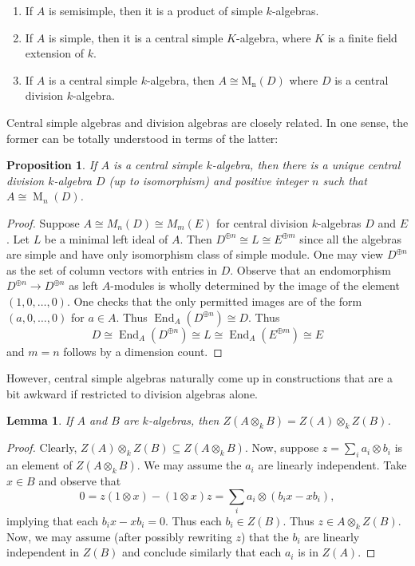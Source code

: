 \documentclass[12pt]{article}
\theoremstyle{plain}
\newtheorem{lemma}[theorem]{Lemma}
\newtheorem{proposition}[theorem]{Proposition}
\theoremstyle{definition}
\theoremstyle{remark}
\numberwithin{equation}{section}
\begin{document}
\begin{enumerate}
\item If $A$ is semisimple, then it is a product of simple $k$-algebras.
\item If $A$ is simple, then it is a central simple $K$-algebra, where
$K$ is a finite field extension of $k$.
\item If $A$ is a central simple $k$-algebra, then $A \cong
\operatorname{M_n}(D)$ where $D$ is a central division $k$-algebra.
\end{enumerate}

Central simple algebras and division algebras are closely related.
In one sense, the former can be totally understood in terms of the latter:

\begin{proposition}
If $A$ is a central simple $k$-algebra, then there is a unique central
division $k$-algebra $D$ (up to isomorphism) and positive integer $n$
such that $A \cong \operatorname{M}_n(D)$.
\end{proposition}

\begin{proof}
Suppose $A \cong M_n(D) \cong M_m(E)$ for central division $k$-algebras
$D$ and $E$.
Let $L$ be a minimal left ideal of $A$.
Then $D^{\oplus n} \cong L \cong E^{\oplus m}$ since all the algebras
are simple and have only isomorphism class of simple module.
One may view $D^{\oplus n}$ as the set of column vectors with
entries in $D$.
Observe that an endomorphism $D^{\oplus n} \to D^{\oplus n}$
as left $A$-modules is wholly determined by the image of
the element $(1,0,\ldots,0)$.  One checks that the only
permitted images are of the form $(a,0,\ldots,0)$ for $a \in A$.
Thus $\operatorname{End}_A(D^{\oplus n}) \cong D$.
Thus
\[
D \cong \operatorname{End}_A(D^{\oplus n})
\cong L
\cong \operatorname{End}_A(E^{\oplus m}) \cong E
\]
and $m=n$ follows by a dimension count.
\end{proof}

However, central simple algebras naturally come up in constructions that
are a bit awkward if restricted to division algebras alone.

\begin{lemma} \label{lem:center_of_tensor}
If $A$ and $B$ are $k$-algebras, then $Z(A \otimes_k B) = Z(A) \otimes_k
Z(B)$.
\end{lemma}

\begin{proof}
Clearly, $Z(A) \otimes_k Z(B) \subseteq Z(A \otimes_k B)$.
Now, suppose $z = \sum_i a_i \otimes b_i$ is an element of
$Z(A \otimes_k B)$.  We may assume the $a_i$ are linearly independent.
Take $x \in B$ and observe that
\[
0 = z(1 \otimes x) - (1 \otimes x)z =
\sum_i a_i \otimes (b_ix-xb_i),
\]
implying that each $b_ix-xb_i=0$.
Thus each $b_i \in Z(B)$.
Thus $z \in A \otimes_k Z(B)$.
Now, we may assume (after possibly rewriting $z$) that the $b_i$
are linearly independent in $Z(B)$
and conclude similarly that each $a_i$ is in $Z(A)$.
\end{proof}
\end{document}
